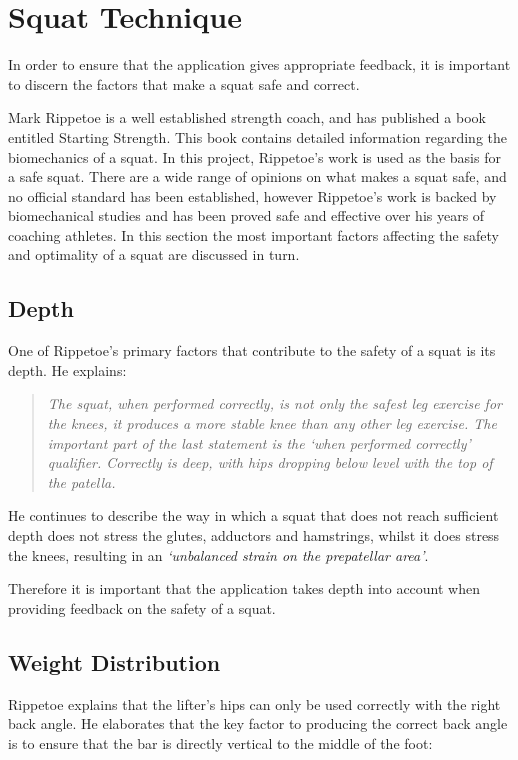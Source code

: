 \chapter{Squat Technique}

In order to ensure that the application gives appropriate feedback, it is important to discern the factors that make a squat safe and correct.

Mark Rippetoe is a well established strength coach, and has published a book entitled Starting Strength\cite{startingstrength}. This book contains detailed information regarding the biomechanics of a squat. In this project, Rippetoe's work is used as the basis for a safe squat. There are a wide range of opinions on what makes a squat safe, and no official standard has been established, however Rippetoe's work is backed by biomechanical studies and has been proved safe and effective over his years of coaching athletes. In this section the most important factors affecting the safety and optimality of a squat are discussed in turn.

\section{Depth}

One of Rippetoe's primary factors that contribute to the safety of a squat is its depth. He explains:

\begin{quote}
\emph{The squat, when performed correctly, is not only the safest leg exercise for the knees, it produces a more stable knee than any other leg exercise. The important part of the last statement is the `when performed correctly' qualifier. Correctly is deep, with hips dropping below level with the 
top of the patella.}
\end{quote}

He continues to describe the way in which a squat that does not reach sufficient depth does not stress the glutes, adductors and hamstrings, whilst it does stress the knees, resulting in an \emph{`unbalanced strain on the prepatellar area'}.

Therefore it is important that the application takes depth into account when providing feedback on the safety of a squat.

\section{Weight Distribution}

Rippetoe explains that the lifter's hips can only be used correctly with the right back angle. He elaborates that the key factor to producing the correct back angle is to ensure that the bar is directly vertical to the middle of the foot:

